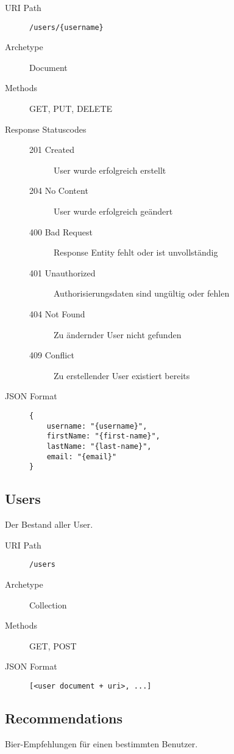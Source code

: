 \documentclass[10pt,a4paper]{scrartcl}
\begin{document}
\begin{description}
	\item[URI Path] \texttt{/users/\{username\}}
	\item[Archetype] Document
	\item[Methods] GET, PUT, DELETE
	\item[Response Statuscodes] \hfill
		\begin{description}
			\item[201 Created] User wurde erfolgreich erstellt
			\item[204 No Content] User wurde erfolgreich geändert
			\item[400 Bad Request] Response Entity fehlt oder ist unvollständig
			\item[401 Unauthorized] Authorisierungsdaten sind ungültig oder fehlen
			\item[404 Not Found] Zu ändernder User nicht gefunden
			\item[409 Conflict] Zu erstellender User existiert bereits
		\end{description}
	\item[JSON Format] \hfill
\begin{lstlisting}
{
	username: "{username}",
	firstName: "{first-name}",
	lastName: "{last-name}",
	email: "{email}"
}
\end{lstlisting}
\end{description}


\subsection{Users}

Der Bestand aller User.

\begin{description}
	\item[URI Path] \texttt{/users}
	\item[Archetype] Collection
	\item[Methods] GET, POST
	\item[JSON Format] \hfill
\begin{lstlisting}
[<user document + uri>, ...]
\end{lstlisting}
\end{description}


\subsection{Recommendations}

Bier-Empfehlungen für einen bestimmten Benutzer.
\end{document}
